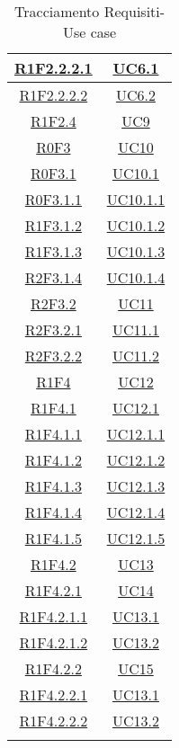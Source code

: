 \begin{longtable}{|c|c|}
	\hline
	\hyperlink{R1F2.2.2.1}{R1F2.2.2.1} & \hyperlink{UC6.1}{UC6.1}\\
	\hline
	\hyperlink{R1F2.2.2.2}{R1F2.2.2.2} & \hyperlink{UC6.2}{UC6.2}\\
	\hline
	\hyperlink{R1F2.4}{R1F2.4} & \hyperlink{UC9}{UC9}\\
	\hline
	\hyperlink{R0F3}{R0F3} & \hyperlink{UC10}{UC10}\\
	\hline
	\hyperlink{R0F3.1}{R0F3.1} & \hyperlink{UC10.1}{UC10.1}\\
	\hline
	\hyperlink{R0F3.1.1}{R0F3.1.1} & \hyperlink{UC10.1.1}{UC10.1.1}\\
	\hline
	\hyperlink{R1F3.1.2}{R1F3.1.2} & \hyperlink{UC10.1.2}{UC10.1.2}\\
	\hline
	\hyperlink{R1F3.1.3}{R1F3.1.3} & \hyperlink{UC10.1.3}{UC10.1.3}\\
	\hline
	\hyperlink{R2F3.1.4}{R2F3.1.4} & \hyperlink{UC10.1.4}{UC10.1.4}\\
	\hline
	\hyperlink{R2F3.2}{R2F3.2} & \hyperlink{UC11}{UC11}\\
	\hline
	\hyperlink{R2F3.2.1}{R2F3.2.1} & \hyperlink{UC11.1}{UC11.1}\\
	\hline
	\hyperlink{R2F3.2.2}{R2F3.2.2} & \hyperlink{UC11.2}{UC11.2}\\
	\hline
	\hyperlink{R1F4}{R1F4} & \hyperlink{UC12}{UC12}\\
	\hline
	\hyperlink{R1F4.1}{R1F4.1} & \hyperlink{UC12.1}{UC12.1}\\
	\hline
	\hyperlink{R1F4.1.1}{R1F4.1.1} & \hyperlink{UC12.1.1}{UC12.1.1}\\
	\hline
	\hyperlink{R1F4.1.2}{R1F4.1.2} & \hyperlink{UC12.1.2}{UC12.1.2}\\
	\hline
	\hyperlink{R1F4.1.3}{R1F4.1.3} & \hyperlink{UC12.1.3}{UC12.1.3}\\
	\hline
	\hyperlink{R1F4.1.4}{R1F4.1.4} & \hyperlink{UC12.1.4}{UC12.1.4}\\
	\hline
	\hyperlink{R1F4.1.5}{R1F4.1.5} & \hyperlink{UC12.1.5}{UC12.1.5}\\
	\hline
	\hyperlink{R1F4.2}{R1F4.2} & \hyperlink{UC13}{UC13}\\
	\hline
	\hyperlink{R1F4.2.1}{R1F4.2.1} & \hyperlink{UC14}{UC14}\\
	\hline
	\hyperlink{R1F4.2.1.1}{R1F4.2.1.1} & \hyperlink{UC13.1}{UC13.1}\\
	\hline
	\hyperlink{R1F4.2.1.2}{R1F4.2.1.2} & \hyperlink{UC13.2}{UC13.2}\\
	\hline
	\hyperlink{R1F4.2.2}{R1F4.2.2} & \hyperlink{UC15}{UC15}\\
	\hline
	\hyperlink{R1F4.2.2.1}{R1F4.2.2.1} & \hyperlink{UC13.1}{UC13.1}\\
	\hline
	\hyperlink{R1F4.2.2.2}{R1F4.2.2.2} & \hyperlink{UC13.2}{UC13.2}\\
	\hline
	\caption[Tracciamento Requisiti-Use case]{Tracciamento Requisiti-Use case}
	\label{tabella:requi-usecase}
\end{longtable}
\clearpage
